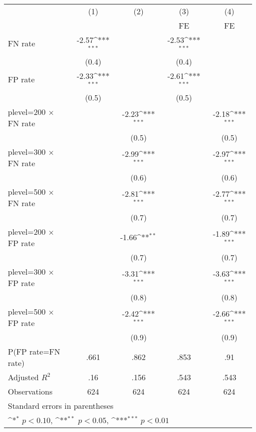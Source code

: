 {
\def\sym#1{\ifmmode^{#1}\else\(^{#1}\)\fi}
\begin{tabular}{l*{4}{c}}
\hline\hline
                &\multicolumn{1}{c}{(1)}&\multicolumn{1}{c}{(2)}&\multicolumn{1}{c}{(3)}&\multicolumn{1}{c}{(4)}\\
                &\multicolumn{1}{c}{}&\multicolumn{1}{c}{}&\multicolumn{1}{c}{FE}&\multicolumn{1}{c}{FE}\\
\hline
FN rate         &    -2.57\sym{***}&                  &    -2.53\sym{***}&                  \\
                &    (0.4)         &                  &    (0.4)         &                  \\
FP rate         &    -2.33\sym{***}&                  &    -2.61\sym{***}&                  \\
                &    (0.5)         &                  &    (0.5)         &                  \\
plevel=200 $\times$ FN rate&                  &    -2.23\sym{***}&                  &    -2.18\sym{***}\\
                &                  &    (0.5)         &                  &    (0.5)         \\
plevel=300 $\times$ FN rate&                  &    -2.99\sym{***}&                  &    -2.97\sym{***}\\
                &                  &    (0.6)         &                  &    (0.6)         \\
plevel=500 $\times$ FN rate&                  &    -2.81\sym{***}&                  &    -2.77\sym{***}\\
                &                  &    (0.7)         &                  &    (0.7)         \\
plevel=200 $\times$ FP rate&                  &    -1.66\sym{**} &                  &    -1.89\sym{***}\\
                &                  &    (0.7)         &                  &    (0.7)         \\
plevel=300 $\times$ FP rate&                  &    -3.31\sym{***}&                  &    -3.63\sym{***}\\
                &                  &    (0.8)         &                  &    (0.8)         \\
plevel=500 $\times$ FP rate&                  &    -2.42\sym{***}&                  &    -2.66\sym{***}\\
                &                  &    (0.9)         &                  &    (0.9)         \\
\hline
P(FP rate=FN rate)&     .661         &     .862         &     .853         &      .91         \\
Adjusted \(R^{2}\)&      .16         &     .156         &     .543         &     .543         \\
Observations    &      624         &      624         &      624         &      624         \\
\hline\hline
\multicolumn{5}{l}{\footnotesize Standard errors in parentheses}\\
\multicolumn{5}{l}{\footnotesize \sym{*} \(p<0.10\), \sym{**} \(p<0.05\), \sym{***} \(p<0.01\)}\\
\end{tabular}
}
